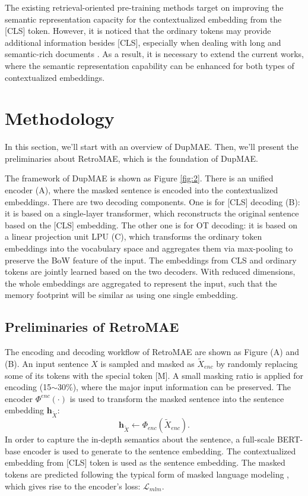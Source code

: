 \documentclass[11pt,a4paper]{article}
\begin{document}
The existing retrieval-oriented pre-training methods target on improving the semantic representation capacity for the contextualized embedding from the [CLS] token. However, it is noticed that the ordinary tokens may provide additional information besides [CLS], especially when dealing with long and semantic-rich documents \cite{luan2021sparse,humeau2019poly,lin2022aggretriever}. As a result, it is necessary to extend the current works, where the semantic representation capability can be enhanced for both types of contextualized embeddings. 


\section{Methodology}
In this section, we'll start with an overview of DupMAE. Then, we'll present the preliminaries about RetroMAE, which is the foundation of DupMAE. 



The framework of DupMAE is shown as Figure \ref{fig:2}. There is an unified encoder (A), where the masked sentence is encoded into the contextualized embeddings. There are two decoding components. One is for [CLS] decoding (B): it is based on a single-layer transformer, which reconstructs the original sentence based on the [CLS] embedding. The other one is for OT decoding: it is based on a linear projection unit LPU (C), which transforms the ordinary token embeddings into the vocabulary space and aggregates them via max-pooling to preserve the BoW feature of the input. The embeddings from CLS and ordinary tokens are jointly learned based on the two decoders. With reduced dimensions, the whole embeddings are aggregated to represent the input, such that the memory footprint will be similar as using one single embedding. 



\subsection{Preliminaries of RetroMAE}
The encoding and decoding workflow of RetroMAE \cite{liu2022retromae} are shown as Figure (A) and (B). 
An input sentence $X$ is sampled and masked as $\tilde{X}_{enc}$ by randomly replacing some of its tokens with the special token [M]. A small masking ratio is applied for encoding (15$\sim$30\%), where the major input information can be preserved. The encoder $\Phi^{enc}(\cdot)$ is used to transform the masked sentence into the sentence embedding $\mathbf{h}_{\tilde{X}}$: 
\begin{equation}
    \mathbf{h}_{\tilde{X}} \leftarrow \Phi_{enc}(\tilde{X}_{enc}). 
\end{equation}
In order to capture the in-depth semantics about the sentence, a full-scale BERT-base encoder is used to generate to the sentence embedding. The contextualized embedding from [CLS] token is used as the sentence embedding. The masked tokens are predicted following the typical form of masked language modeling \cite{Devlin2019BERT}, which gives rise to the encoder's loss: $\mathcal{L}_{mlm}$. 
\end{document}
